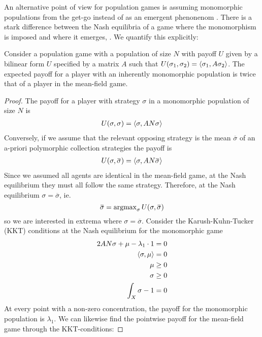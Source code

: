An alternative point of view for population games is assuming monomorphic populations from the get-go instead of as an emergent phenonenom \citep{vincent2005evolutionary}. There is a stark difference between the Nash equilibria of a game where the monomorphism is imposed and where it emerges, \citep{kvrivan2008ideal,collet2019algorithmic}. We quantify this explicitly:
\begin{proposition}
  \label{prop:doubleup}
  Consider a population game with a population of size $N$ with payoff $U$ given by a bilinear form $U$ specified by a matrix $A$ such that $U(\sigma_1,\sigma_2) = \left \langle \sigma_1,A \sigma_2 \right \rangle$. The expected payoff for a player with an inherently monomorphic population is twice that of a player in the mean-field game.
\end{proposition}
\begin{proof}
The payoff for a player with strategy $\sigma$ in a  monomorphic population of size $N$ is
\begin{align}
  U(\sigma,\sigma) = \left \langle \sigma,A N \sigma \right \rangle
\end{align}
Conversely, if we assume that the relevant opposing strategy is the mean $\overbar{\sigma}$ of an a-priori polymorphic collection strategies the payoff is
\begin{align}
  U(\sigma, \overbar{\sigma}) = \ip{\sigma}{AN \overbar{\sigma}}
\end{align}
Since we assumed all agents are identical in the mean-field game, at the Nash equilibrium they must all follow the same strategy. Therefore, at the Nash equilibrium $\sigma = \overbar{\sigma}$, ie.
\begin{equation}
  \overbar{\sigma} = \argmax_{\sigma} U(\sigma,\overbar{\sigma})
\end{equation}
so we are interested in extrema where $\sigma=\overbar{\sigma}$.
Consider the Karush-Kuhn-Tucker (KKT) conditions at the Nash equilibrium for the monomorphic game
\begin{align}
  \begin{split}
    2AN\sigma + \mu - \lambda_1 \cdot 1 = 0 \\
    \left \langle \sigma,\mu \right \rangle = 0 \\
    \mu \geq 0 \\
    \sigma \geq 0 \\
    \int_X \sigma - 1 = 0
  \end{split}
\end{align}
At every point with a non-zero concentration, the payoff for the monomorphic population is $\lambda_1$. We can likewise find the pointwise payoff for the mean-field game through the KKT-conditions:

\end{proof}
